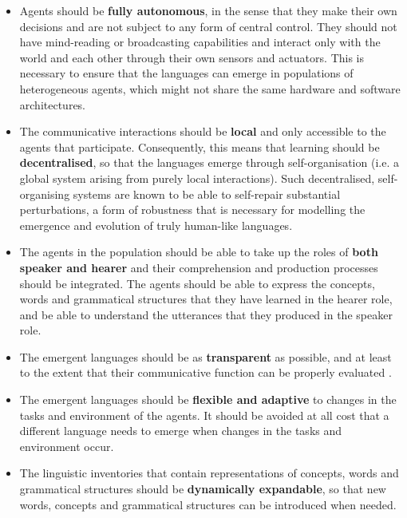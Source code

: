 \documentclass[a4paper,abstract]{scrartcl}
\begin{document}
\begin{itemize}
\item Agents should be \textbf{fully autonomous}, in the sense that they make their own decisions and are not subject to any form of central control. They should not have mind-reading or broadcasting capabilities and interact only with the world and each other through their own sensors and actuators. This is necessary to ensure that the languages can emerge in populations of heterogeneous agents, which might not share the same hardware and software architectures.

\item The communicative interactions should be \textbf{local} and only accessible to the agents that participate. Consequently, this means that learning should be \textbf{decentralised}, so that the languages emerge through self-organisation (i.e. a global system arising from purely local interactions). Such decentralised, self-organising systems are known to be able to self-repair substantial perturbations, a form of robustness that is necessary for modelling the emergence and evolution of truly human-like languages.

\item The agents in the population should be able to take up the roles of \textbf{both speaker and hearer} and their comprehension and production processes should be integrated. The agents should be able to express the concepts, words and grammatical structures that they have learned in the hearer role, and be able to understand the utterances that they produced in the speaker role.

\item The emergent languages should be as \textbf{transparent} as possible, and at least to the extent that their communicative function can be properly evaluated \citep{lowe2019pitfalls}.

\item The emergent languages should be \textbf{flexible and adaptive} to changes in the tasks and environment of the agents. It should be avoided at all cost that a different language needs to emerge when changes in the tasks and environment occur.

\item The linguistic inventories that contain representations of concepts, words and grammatical structures should be \textbf{dynamically expandable}, so that new words, concepts and grammatical structures can be introduced when needed.

\end{itemize}
\end{document}
